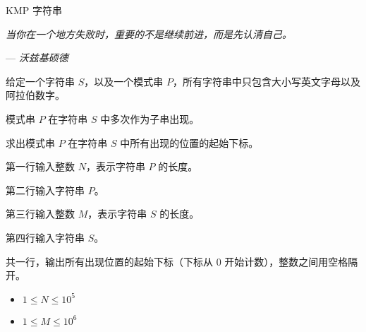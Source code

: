 KMP 字符串

\epigraph{\it{当你在一个地方失败时，重要的不是继续前进，而是先认清自己。}}{--- \it{沃兹基硕德}}
给定一个字符串 $S$，以及一个模式串 $P$，所有字符串中只包含大小写英文字母以及阿拉伯数字。

模式串 $P$ 在字符串 $S$ 中多次作为子串出现。

求出模式串 $P$ 在字符串 $S$ 中所有出现的位置的起始下标。

第一行输入整数 $N$，表示字符串 $P$ 的长度。

第二行输入字符串 $P$。

第三行输入整数 $M$，表示字符串 $S$ 的长度。

第四行输入字符串 $S$。

共一行，输出所有出现位置的起始下标（下标从 $0$ 开始计数），整数之间用空格隔开。

\begin{itemize}
    \item $1 \leq N \leq 10^5$
    \item $1 \leq M \leq 10^6$
\end{itemize}